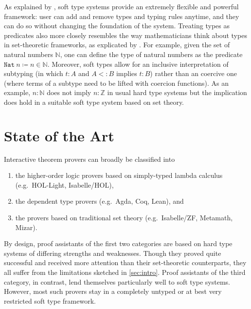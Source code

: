 \documentclass[a4paper, 12pt]{article}
\theoremstyle{plain}
\theoremstyle{definition}
\begin{document}
As explained by \citet{krauss},
soft type systems provide an extremely flexible and powerful framework:
user can add and remove types and typing rules anytime,
and they can do so without changing the foundation of the system.
Treating types as predicates also more closely
resembles the way mathematicians
think about types in set-theoretic frameworks,
as explicated by \citet{harrison}.
For example,
given the set of natural numbers $\mathbb{N}$,
one can define the type of natural numbers as the predicate
$\mathtt{Nat}\ n \coloneqq n \in \mathbb{N}$.
Moreover,
soft types allow for an inclusive
interpretation of subtyping (in which $t : A$ and $A <: B$ implies $t : B$)
rather than
an coercive one (where terms of a subtype need to be lifted with coercion functions).
As an example, $n : \mathbb{N}$ does not imply $n : \mathbb{Z}$ in usual hard type systems
but the implication does hold in a suitable soft type system based on set theory.

\section{State of the Art}

Interactive theorem provers can broadly be
classified into
\begin{enumerate}
\item the higher-order logic provers
based on simply-typed lambda calculus
(e.g.\ HOL-Light, Isabelle/HOL),
\item the dependent type provers (e.g.\ Agda, Coq, Lean), and
\item the provers based on traditional set theory (e.g.\ Isabelle/ZF, Metamath, Mizar).
\end{enumerate}
By design, proof assistants of the first two categories are based on hard type systems of differing strengths and weaknesses.
Though they proved quite successful and
received more attention than their set-theoretic counterparts,
they all suffer from the limitations sketched in \cref{sec:intro}.
Proof assistants of the third category,
in contrast,
lend themselves particularly well to soft type systems.
However, most such provers stay in a completely untyped or at best very restricted soft type framework.
\end{document}
